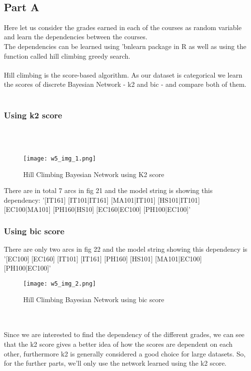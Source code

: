 \documentclass[conference]{IEEEtran}
\begin{document}
\\
\subsection{Part A}
Here let us consider the grades earned in each of the courses as random variable and learn the dependencies between the courses.
\\
The dependencies can be learned using  'bnlearn package in R as well as using the function called hill climbing greedy search. 
\\
\\
Hill climbing is the score-based algorithm. As our dataset is categorical we learn the scores of discrete Bayesian Network - k2 and bic - and compare both of them.\cite{b3}
\\
\\

\subsubsection{Using k2 score}
\\
\\
\begin{figure}[htbp]
\centerline{\texttt{[image: w5\_img\_1.png]}}
\caption{Hill Climbing Bayesian Network using K2 score}
\label{fig}
\end{figure}

There are in total 7 arcs in fig 21 and the model string is showing this dependency: '[IT161] [IT101|IT161] [MA101|IT101] [HS101|IT101]
[EC100|MA101] [PH160|HS10] [EC160|EC100]
[PH100|EC100]’

\subsubsection{Using bic score}

There are only two arcs in fig 22 and the model string showing this dependency is '[EC100] [EC160] [IT101] [IT161] [PH160] [HS101]
[MA101|EC100] [PH100|EC100]'

\begin{figure}[htbp]
\centerline{\texttt{[image: w5\_img\_2.png]}}
\caption{Hill Climbing Bayesian Network using bic score}
\label{fig}
\end{figure}
\\
\\
Since we are interested to find the dependency of the
different grades, we can see that the k2 score gives a better idea
of how the scores are dependent on each other, furthermore k2 is generally considered a good choice for large datasets. So, for the further parts, we’ll only use the network learned
using the k2 score.\cite{b8}
\\
\\
\end{document}
